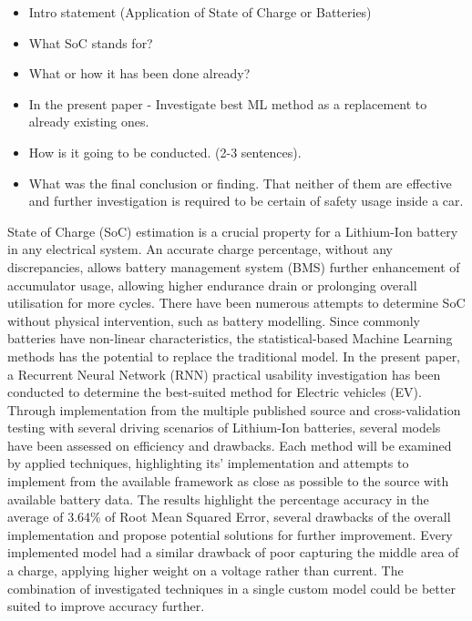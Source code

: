 %
{
\begin{itemize}
    \item Intro statement (Application of State of Charge or Batteries)
    \item What SoC stands for?
    \item What or how it has been done already?
    \item In the present paper - Investigate best ML method as a replacement to already existing ones.
    \item How is it going to be conducted. (2-3 sentences).
    \item What was the final conclusion or finding. That neither of them are effective and further investigation is required to be certain of safety usage inside a car.
\end{itemize}

State of Charge (SoC) estimation is a crucial property for a Lithium-Ion battery in any electrical system.
An accurate charge percentage, without any discrepancies, allows battery management system (BMS) further enhancement of accumulator usage, allowing higher endurance drain or prolonging overall utilisation for more cycles.
There have been numerous attempts to determine SoC without physical intervention, such as battery modelling.
Since commonly batteries have non-linear characteristics, the statistical-based Machine Learning methods has the potential to replace the traditional model.
In the present paper, a Recurrent Neural Network (RNN) practical usability investigation has been conducted to determine the best-suited method for Electric vehicles (EV).
Through implementation from the multiple published source and cross-validation testing with several driving scenarios of Lithium-Ion batteries, several models have been assessed on efficiency and drawbacks.%
Each method will be examined by applied techniques, highlighting its' implementation and attempts to implement from the available framework as close as possible to the source with available battery data.
The results highlight the percentage accuracy in the average of 3.64\% of Root Mean Squared Error, several drawbacks of the overall implementation and propose potential solutions for further improvement.
Every implemented model had a similar drawback of poor capturing the middle area of a charge, applying higher weight on a voltage rather than current.
The combination of investigated techniques in a single custom model could be better suited to improve accuracy further.
}